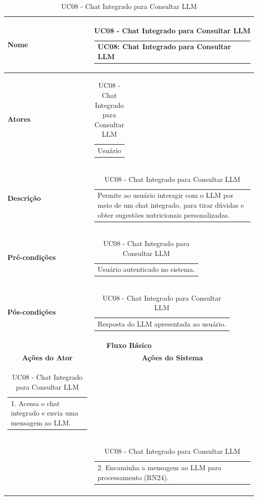 \begin{longtable}[c]{|p{}|p{}|}
\caption{UC08 - Chat Integrado para Consultar LLM}
\label{tab:uc08}\\
\hline
\multicolumn{1}{|p{0.48\textwidth}|}{\textbf{Nome}} &
  \begin{tabular}[c]{@{}p{}@{}}UC08: Chat Integrado para Consultar LLM\end{tabular} \\ \hline
\endfirsthead
\endhead

\multicolumn{1}{|p{0.48\textwidth}|}{\textbf{Atores}} &
  \begin{tabular}[c]{@{}p{}@{}}Usuário\end{tabular} \\ \hline
\multicolumn{1}{|p{0.48\textwidth}|}{\textbf{Descrição}} &
  \begin{tabular}[c]{@{}p{}@{}}Permite ao usuário interagir com o LLM por meio de um chat integrado, para tirar dúvidas e obter sugestões nutricionais personalizadas.\end{tabular} \\ \hline
\multicolumn{1}{|p{0.48\textwidth}|}{\textbf{Pré-condições}} &
  \begin{tabular}[c]{@{}p{}@{}}Usuário autenticado no sistema.\end{tabular} \\ \hline
\multicolumn{1}{|p{0.48\textwidth}|}{\textbf{Pós-condições}} &
  \begin{tabular}[c]{@{}p{}@{}}Resposta do LLM apresentada ao usuário.\end{tabular} \\ \hline
\multicolumn{2}{|c|}{\textbf{Fluxo Básico}} \\ \hline
\multicolumn{1}{|c|}{\textbf{Ações do Ator}} &
  \multicolumn{1}{c|}{\textbf{Ações do Sistema}} \\ \hline
\multicolumn{1}{|p{0.48\textwidth}|}{\begin{tabular}[c]{@{}p{}@{}}1. Acessa o chat integrado e envia uma mensagem ao LLM.\end{tabular}} & \\ \hline
\multicolumn{1}{|p{0.48\textwidth}|}{} &
  \begin{tabular}[c]{@{}p{}@{}}2. Encaminha a mensagem ao LLM para processamento (RN24).\end{tabular} \\ \hline
\multicolumn{1}{|p{0.48\textwidth}|}{} &

\end{longtable}
